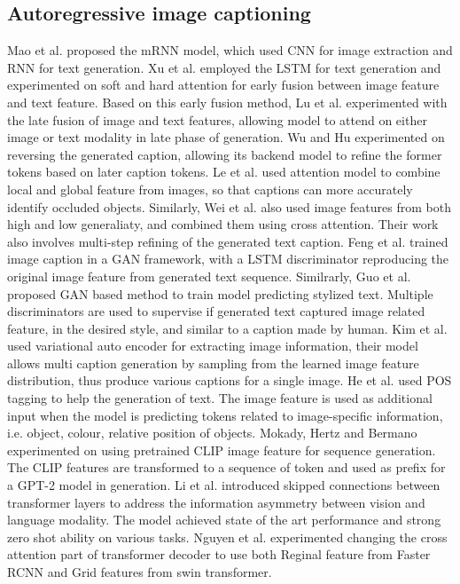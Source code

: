 \documentclass{article}
\begin{document}
\subsection{Autoregressive image captioning}
Mao et al. proposed the mRNN model\cite{https://doi.org/10.48550/arxiv.1412.6632}, which used CNN for image extraction and RNN for text generation. Xu et al. \cite{DBLP:journals/corr/XuBKCCSZB15} employed the LSTM for text generation and experimented on soft and hard attention for early fusion between image feature and text feature. Based on this early fusion method, Lu et al. \cite{DBLP:journals/corr/LuXPS16} experimented with the late fusion of image and text features, allowing model to attend on either image or text modality in late phase of generation. Wu and Hu \cite{cascade-RNN} experimented on reversing the generated caption, allowing its backend model to refine the former tokens based on later caption tokens. Le et al. \cite{gla} used attention model to combine local and global feature from images, so that captions can more accurately identify occluded objects. Similarly, Wei et al. \cite{stack-vs} also used image features from both high and low generaliaty, and combined them using cross attention. Their work also involves multi-step refining of the generated text caption. Feng et al. \cite{DBLP:journals/corr/abs-1811-10787} trained image caption in a GAN framework, with a LSTM discriminator reproducing the original image feature from generated text sequence. Similrarly, Guo et al. \cite{mscap} proposed GAN based method to train model predicting stylized text. Multiple discriminators are used to supervise if generated text captured image related feature, in the desired style, and similar to a caption made by human. Kim et al. \cite{vae-caption} used variational auto encoder for extracting image information, their model allows multi caption generation by sampling from the learned image feature distribution, thus produce various captions for a single image. He et al. \cite{image-caption-with-pos} used POS tagging to help the generation of text. The image feature is used as additional input when the model is predicting tokens related to image-specific information, i.e. object, colour, relative position of objects. Mokady, Hertz and Bermano \cite{clipcap} experimented on using pretrained CLIP image feature for sequence generation. The CLIP features are transformed to a sequence of token and used as prefix for a GPT-2 model in generation. Li et al. \cite{mplug} introduced skipped connections between transformer layers to address the information asymmetry between vision and language modality. The model achieved state of the art performance and strong zero shot ability on various tasks. Nguyen et al. \cite{grit} experimented changing the cross attention part of transformer decoder to use both Reginal feature from Faster RCNN and Grid features from swin transformer. 
\end{document}
